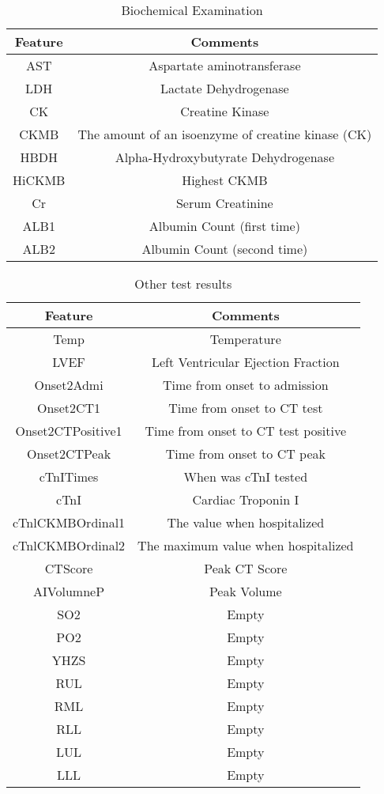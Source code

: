 \vfill

\clearpage

\null
\vfill

\begin{table}[H]
\centering
\begin{tabular}{@{}cc@{}}
\toprule
Feature                   & Comments  \\ 
\toprule
AST	& Aspartate aminotransferase\\
LDH	& Lactate Dehydrogenase  \\
CK	& Creatine Kinase	 \\
CKMB &  The amount of an isoenzyme of creatine kinase (CK)  \\
HBDH & Alpha-Hydroxybutyrate Dehydrogenase \\
HiCKMB & Highest CKMB  \\
Cr & Serum Creatinine \\
ALB1 &	Albumin Count (first time) \\
ALB2 &	Albumin Count (second time) \\
\bottomrule
\end{tabular}
\caption{Biochemical Examination}
\end{table}

\begin{table}[H]
\centering
\begin{tabular}{@{}cc@{}}
\toprule
Feature                   & Comments  \\ 
\toprule
Temp & Temperature \\
LVEF & Left Ventricular Ejection Fraction\\
Onset2Admi & Time from onset to admission \\
Onset2CT1 & Time from onset to CT test\\
Onset2CTPositive1 & Time from onset to CT test positive \\
Onset2CTPeak & Time from onset to CT peak \\
cTnITimes &	When was cTnI tested  \\
cTnI & Cardiac Troponin I	 \\
cTnlCKMBOrdinal1  & The value when hospitalized	 \\
cTnlCKMBOrdinal2 & The maximum value when hospitalized \\
CTScore & Peak CT Score  \\
AIVolumneP & Peak Volume \\
SO2 & Empty \\
PO2 & Empty  \\
YHZS & Empty\\
RUL & Empty \\
RML & Empty  \\
RLL & Empty  \\
LUL & Empty  \\
LLL & Empty \\
\bottomrule
\end{tabular}
\caption{Other test results}
\end{table}

\vfill
